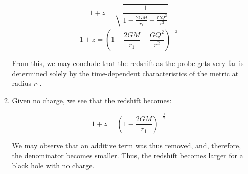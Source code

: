 \begin{enumerate}
\begin{enumerate}
        $$1+z=\sqrt{\frac{1}{1-\frac{2GM}{r_1}+\frac{GQ^2}{r^2}}}$$
        $$\boxed{1+z=\left(1-\frac{2GM}{r_1}+\frac{GQ^2}{r^2}\right)^{-\frac{1}{2}}}$$

        From this, we may conclude that the redshift as the probe gets very far is determined solely by the time-dependent characteristics of the metric at radius $r_1$.

      \item

        Given no charge, we see that the redshift becomes:

        $$\boxed{1+z=\left(1-\frac{2GM}{r_1}\right)^{-\frac{1}{2}}}$$

      We may observe that an additive term was thus removed, and, therefore, the denominator becomes smaller. Thus, \underline{the redshift becomes larger for a black hole with} \underline{no charge.}

    \end{enumerate}

\end{enumerate}



